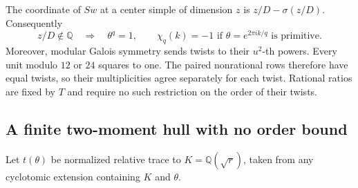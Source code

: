 The coordinate of $Sw$ at a center simple of dimension $z$ is
$z/D-\sigma(z/D)$. Consequently
\begin{equation}\label{eq:quadratic-saturated-twist}
 z/D\notin\mathbb Q\quad\Longrightarrow\quad
 \theta^q=1,\qquad
 \chi_q(k)=-1\text{ if }\theta=e^{2\pi ik/q}\text{ is primitive}.
\end{equation}
Moreover, modular Galois symmetry sends twists to their $u^2$-th
powers. Every unit modulo $12$ or $24$ squares to one. The paired
nonrational rows therefore have equal twists, so their multiplicities
agree separately for each twist. Rational ratios are fixed by $T$ and
require no such restriction on the order of their twists.

\subsection{A finite two-moment hull with no order bound}
Let $t(\theta)$ be normalized relative trace to $K=\mathbb Q(\sqrt r)$,
taken from any cyclotomic extension containing $K$ and $\theta$.

